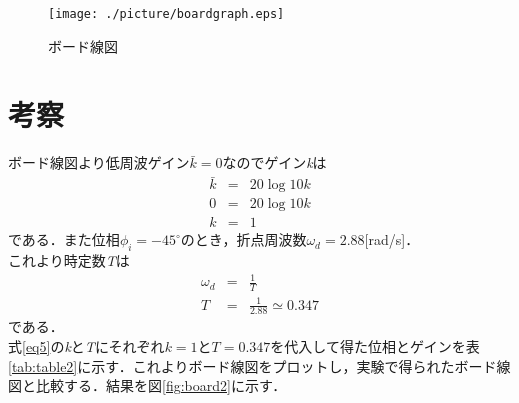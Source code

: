 \documentclass{jsarticle}
\begin{document}
\newpage

\begin{figure}[hb]
 \begin{center}
  \texttt{[image: ./picture/boardgraph.eps]}
  \caption{ボード線図}
  \label{fig:board}
 \end{center}
\end{figure}

\newpage

 \section{考察}
 ボード線図より低周波ゲイン$\bar{k} = 0$なのでゲイン{\it k}は
 \begin{eqnarray*}
 \bar{k} & = &20\log{10}k \\
  0 & = & 20\log{10}k \\
  k & = & 1
 \end{eqnarray*}
 である．また位相$\phi_i = -45^\circ $のとき，折点周波数$\omega_d = 2.88$[rad/s]．\\
 これより時定数{\it T}は
\begin{eqnarray*}
 \omega_d & = & \frac{1}{T} \\
 T & = & \frac{1}{2.88} \simeq 0.347
\end{eqnarray*}
である． \\
式\ref{eq5}の{\it k}と{\it T}にそれぞれ$k = 1$と$T = 0.347$を代入して得た位相とゲインを表\ref{tab:table2}に示す．これよりボード線図をプロットし，実験で得られたボード線図と比較する．結果を図\ref{fig:board2}に示す．
\end{document}
